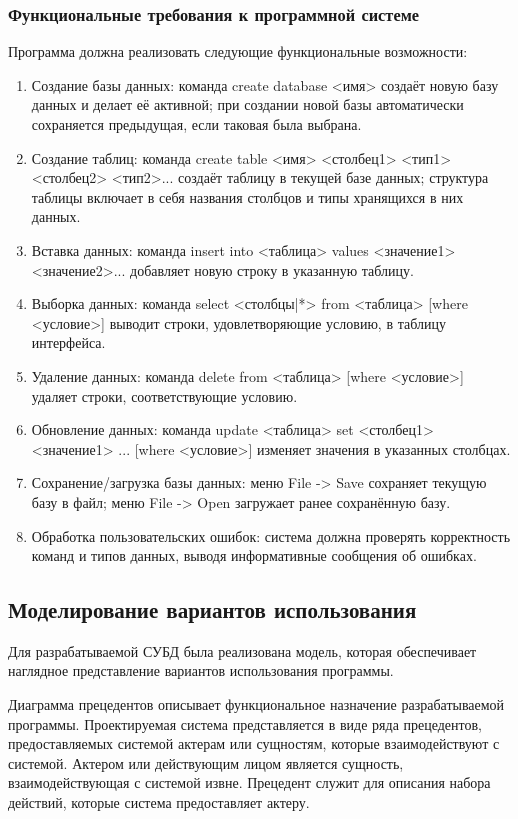 \subsubsection{Функциональные требования к программной системе}

Программа должна реализовать следующие функциональные возможности:
\begin{enumerate}
	\item Создание базы данных: команда create database <имя> создаёт новую базу данных и делает её активной; при создании новой базы автоматически сохраняется предыдущая, если таковая была выбрана.
	\item Создание таблиц: команда create table <имя> <столбец1> <тип1> <столбец2> <тип2>... создаёт таблицу в текущей базе данных; структура таблицы включает в себя названия столбцов и типы хранящихся в них данных.
	\item Вставка данных: команда insert into <таблица> values <значение1> <значение2>... добавляет новую строку в указанную таблицу.
	\item Выборка данных: команда select <столбцы|*> from <таблица> [where <условие>] выводит строки, удовлетворяющие условию, в таблицу интерфейса.
	\item Удаление данных: команда delete from <таблица> [where <условие>] удаляет строки, соответствующие условию.
	\item Обновление данных: команда update <таблица> set <столбец1> <значение1> ... [where <условие>] изменяет значения в указанных столбцах.
	\item Сохранение/загрузка базы данных: меню File -> Save сохраняет текущую базу в файл; меню File -> Open загружает ранее сохранённую базу.
	\item Обработка пользовательских ошибок: система должна проверять корректность команд и типов данных, выводя информативные сообщения об ошибках.
\end{enumerate}

\subsection{Моделирование вариантов использования}

Для разрабатываемой СУБД была реализована модель, которая обеспечивает наглядное представление вариантов использования программы.

Диаграмма прецедентов описывает функциональное назначение разрабатываемой программы. Проектируемая система представляется в виде ряда прецедентов, предоставляемых системой актерам или сущностям, которые взаимодействуют с системой. Актером или действующим лицом является сущность, взаимодействующая с системой извне. Прецедент служит для описания набора действий, которые система предоставляет актеру.


